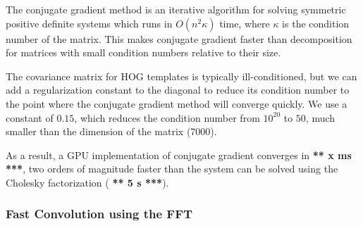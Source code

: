 \documentclass[10pt,twocolumn,letterpaper]{article}
\newcommand{\scream}[1]{{\color{red} \bf *** #1 ***}}
\begin{document}
The conjugate gradient method is an iterative algorithm for solving symmetric positive definite systems which runs in $O(n^2\kappa)$ time, where $\kappa$ is the condition number of the matrix.
This makes conjugate gradient faster than decomposition for matrices with small condition
numbers relative to their size.

The covariance matrix for HOG templates is typically ill-conditioned, but we can add a regularization constant to the diagonal to reduce its condition number to the point where the conjugate gradient method will converge quickly. We use a constant of $0.15$, which reduces the condition number from $10^{20}$ to $50$, much smaller than the dimension of the matrix (7000).

As a result, a GPU implementation of conjugate gradient converges in \scream{x
ms}, two orders of magnitude faster than the system can be solved using the
Cholesky factorization (\scream{5 s}).

\subsubsection{Fast Convolution using the FFT}










\end{document}
